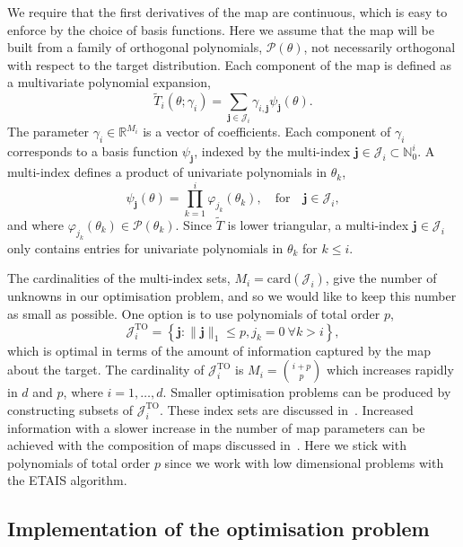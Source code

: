 \documentclass[final]{siamltex}
\begin{document}
We require that the first derivatives of the map are continuous, which is easy to enforce by the choice of basis functions. Here we assume that the map will be built from a family of orthogonal polynomials, $\mathcal{P}(\theta)$, not necessarily orthogonal with respect to the target distribution. Each component of the map is defined as a multivariate polynomial expansion,
\begin{equation}\label{eq:map_defn}
	\tilde{T}_i(\theta; \gamma_i) = \sum\limits_{\mathbf{j}\in\mathcal{J}_i} \!
\gamma_{i,\mathbf{j}}\psi_\mathbf{j}(\theta).
\end{equation}
The parameter $\gamma_i \in \mathbb{R}^{M_i}$ is a vector of coefficients. Each component of $\gamma_i$ corresponds to a basis function
$\psi_\mathbf{j}$, indexed by the multi-index $\mathbf{j} \in
\mathcal{J}_i \subset \mathbb{N}_0^i$. A multi-index defines a product of univariate polynomials in $\theta_k$,
\[
	\psi_\mathbf{j}(\theta) = \prod\limits_{k=1}^i \! \varphi_{j_k}(\theta_k), \quad \text{for} \quad \mathbf{j} \in \mathcal{J}_i,
\]
and where $\varphi_{j_k}(\theta_k) \in \mathcal{P}(\theta_k)$. Since $\tilde{T}$ is lower triangular, a multi-index $\mathbf{j}\in\mathcal{J}_i$ only contains entries for univariate polynomials in $\theta_k$ for $k\leq i$.

The cardinalities of the multi-index sets, $M_i = \text{card}(\mathcal{J}_i)$, give the number of unknowns in our
optimisation problem, and so we would like to keep this number as small as possible. One option is
to use polynomials of total order $p$,
\[
	\mathcal{J}_i^\text{TO} = \left\{\mathbf{j}:\|\mathbf{j}\|_1 \leq p, j_k = 0\ \forall k > i\right\},
\]
which is optimal in terms of the amount of information captured by the map about the target. The cardinality of $\mathcal{J}_i^\text{TO}$ is $M_i = \binom{i+p}{p}$ which increases rapidly in $d$ and $p$, where $i = 1, \dots, d$. Smaller optimisation problems can be produced by constructing subsets of $\mathcal{J}_i^\text{TO}$. These index sets are discussed
in~\cite{parno2014transport}. Increased information with a slower increase in the number of map parameters can be achieved with the composition of maps discussed in~\cite{parno2015transport}. Here we stick with polynomials of total order $p$ since we work with low dimensional problems with the ETAIS algorithm.


\subsection{Implementation of the optimisation problem}\label{sec:transport_implementation}
\end{document}
